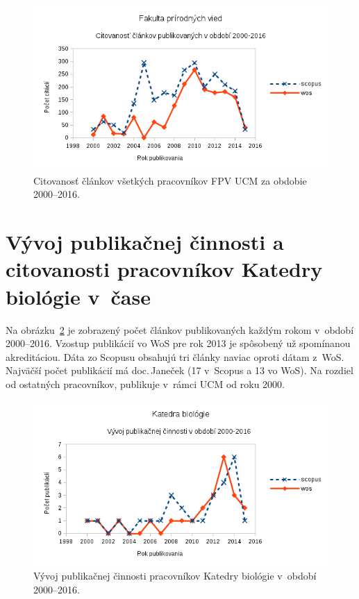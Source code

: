 \begin{figure}
  \centering
  \includegraphics[width=\textwidth]{obr/plot-fns-citations.png}
  \caption{Citovanosť článkov všetkých pracovníkov FPV UCM za obdobie 2000--2016.}
  \label{fig:plot.fns.citations}
\end{figure}



\section{Vývoj publikačnej činnosti a citovanosti pracovníkov Katedry biológie
v~čase}

Na obrázku~\ref{fig:plot.bio.publications} je zobrazený počet článkov
publikovaných každým rokom v~období 2000--2016.  Vzostup publikácií vo WoS pre
rok 2013 je spôsobený už spomínanou akreditáciou.  Dáta zo Scopusu obsahujú tri
články naviac oproti dátam z~WoS.  Najväčší počet publikácií má doc.\,Janeček
(17 v~Scopus a 13 vo WoS).  Na rozdiel od ostatných pracovníkov, publikuje
v~rámci UCM od roku 2000.

\begin{figure}
  \centering
  \includegraphics[width=\textwidth]{obr/plot-bio-publications.png}
  \caption{Vývoj publikačnej činnosti pracovníkov Katedry biológie v~období 2000--2016.}
  \label{fig:plot.bio.publications}
\end{figure}

